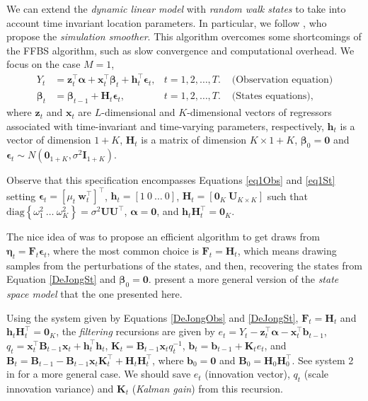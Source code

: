 We can extend the \textit{dynamic linear model} with \textit{random walk states} to take into account time invariant location parameters. In particular, we follow \cite{de1995simulation}, who propose the \textit{simulation smoother}. This algorithm overcomes some shortcomings of the FFBS algorithm, such as slow convergence and computational overhead. We focus on the case $M=1$, 
\begin{align}
	{Y}_t&=\bm{z}_t^{\top}\bm{\alpha}+\bm{x}_t^{\top}\bm{\beta}_t+\bm{h}_t^{\top}\bm{\epsilon}_t,& t=1,2,\dots,T. & \text{   (Observation equation)}\label{DeJongObs}\\
	\bm{\beta}_t&=\bm{\beta}_{t-1}+\bm{H}_t\bm{\epsilon}_t, & t=1,2,\dots,T. & \text{   (States equations)}\label{DeJongSt},
\end{align}
where $\bm{z}_t$ and $\bm{x}_t$ are $L$-dimensional and $K$-dimensional vectors of regressors associated with time-invariant and time-varying parameters, respectively, $\bm{h}_t$ is a vector of dimension $1+K$, $\bm{H}_t$ is a matrix of dimension $K\times 1+K$, $\bm{\beta}_0=\bm{0}$ and $\bm{\epsilon}_t\sim N(\bm{0}_{1+K},\sigma^2\bm{I}_{1+K})$.

Observe that this specification encompasses Equations \ref{eq1Obs} and \ref{eq1St} setting $\bm{\epsilon}_t=[\mu_t \ \bm{w}_t^{\top}]^{\top}$, $\bm{h}_t=[1 \ 0 \ \dots \ 0]$, $\bm{H}_t=[\bm{0}_K \ \bm{U}_{K\times K}]$ such that $\text{diag}\left\{\omega_1^2 \ \dots \ \omega_K^2\right\}=\sigma^2\bm{U}\bm{U}^{\top}$, $\bm{\alpha}=\bm{0}$, and $\bm{h}_t\bm{H}_t^{\top}=\bm{0}_{K}$.

The nice idea of \cite{de1995simulation} was to propose an efficient algorithm to get draws from $\bm{\eta}_t=\bm{F}_t\bm{\epsilon}_t$, where the most common choice is $\bm{F}_t=\bm{H}_t$, which means drawing samples from the perturbations of the states, and then, recovering the states from Equation \ref{DeJongSt} and $\bm{\beta}_0=\bm{0}$. \cite{de1995simulation} present a more general version of the \textit{state space model} that the one presented here. 

Using the system given by Equations \ref{DeJongObs} and \ref{DeJongSt}, $\bm{F}_t=\bm{H}_t$ and $\bm{h}_t\bm{H}_t^{\top}=\bm{0}_{K}$, the \textit{filtering} recursions are given by $e_t=Y_t-\bm{z}_t^{\top}\bm{\alpha}-\bm{x}_t^{\top}\bm{b}_{t-1}$, ${q}_t=\bm{x}_t^{\top}\bm{B}_{t-1}\bm{x}_t+\bm{h}_t^{\top}\bm{h}_t$, $\bm{K}_t=\bm{B}_{t-1}\bm{x}_tq_t^{-1}$, $\bm{b}_t=\bm{b}_{t-1}+\bm{K}_t e_t$, and $\bm{B}_t=\bm{B}_{t-1}-\bm{B}_{t-1}\bm{x}_t\bm{K}_t^{\top}+\bm{H}_t\bm{H}_t^{\top}$, where $\bm{b}_0=\bm{0}$ and $\bm{B}_0=\bm{H}_0\bm{H}_0^{\top}$. See system 2 in \cite{de1995simulation} for a more general case. We should save $e_t$ (innovation vector), $q_t$ (scale innovation variance) and $\bm{K}_t$ (\textit{Kalman gain}) from this recursion. 

